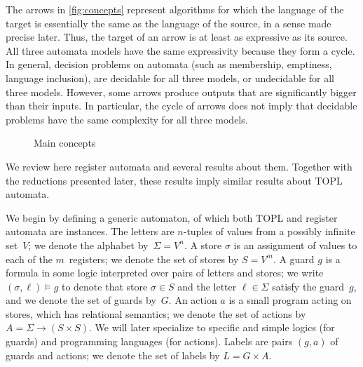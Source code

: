 \documentclass[9pt, preprint]{sigplanconf} %
\theoremstyle{definition}
\theoremstyle{remark}
\begin{document}
The arrows in \autoref{fig:concepts} represent algorithms for which the language of the target is essentially the same as the language of the source, in a sense made precise later.
Thus, the target of an arrow is at least as expressive as its source.
All three automata models have the same expressivity because they form a cycle.
In general, decision problems on automata (such as membership, emptiness, language inclusion), are decidable for all three models, or undecidable for all three models.
However, some arrows produce outputs that are significantly bigger than their inputs.
In particular, the cycle of arrows does not imply that decidable problems have the same complexity for all three models.

\begin{figure}[th]\centering
{}
\caption{Main concepts}
\label{fig:concepts}
\end{figure}

We review here register automata and several results about them.
Together with the reductions presented later, these results imply similar results about TOPL automata.

We begin by defining a generic automaton, of which both TOPL and register automata are instances.
The letters are $n$-tuples of values from a possibly infinite set~$V$;
we denote the alphabet by~$\Sigma=V^n$.
A store $\sigma$ is an assignment of values to each of the $m$~registers;
we denote the set of stores by $S=V^m$.
A guard $g$ is a formula in some logic interpreted over pairs of letters and stores;
we write $(\sigma,\ell)\models g$ to denote that store $\sigma\in S$ and the letter $\ell\in\Sigma$ satisfy the guard~$g$, and we denote the set of guards by~$G$.
An action $a$ is a small program acting on stores, which has relational semantics;
we denote the set of actions by $A=\Sigma\to(S\times S)$.
We will later specialize to specific and simple logics (for guards) and programming languages (for actions).
Labels are pairs $(g,a)$ of guards and actions;
we denote the set of labels by $L=G\times A$.
\end{document}
